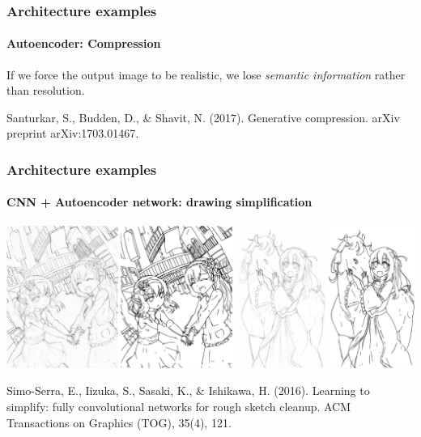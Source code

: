 \documentclass[9pt]{beamer}
\begin{document}
\begin{frame}
  \frametitle{Architecture examples}

  \framesubtitle{Autoencoder: Compression}

  \begin{center}
  \end{center}

  \medskip

  If we force the output image to be realistic, we lose
  \emph{semantic information} rather than resolution.

  \bigskip

  {\footnotesize Santurkar, S., Budden, D., \& Shavit,
    N. (2017). Generative compression. arXiv preprint
    arXiv:1703.01467.}
\end{frame}

\begin{frame}
  \frametitle{Architecture examples}

  \framesubtitle{CNN + Autoencoder network: drawing simplification}

  \begin{center}
    \includegraphics[width = \linewidth]{images/drawing_simplification_example.png}
  \end{center}

  \bigskip

  {\footnotesize Simo-Serra, E., Iizuka, S., Sasaki, K., \& Ishikawa,
    H. (2016). Learning to simplify: fully convolutional networks for
    rough sketch cleanup. ACM Transactions on Graphics (TOG), 35(4),
    121.}
\end{frame}
\end{document}
